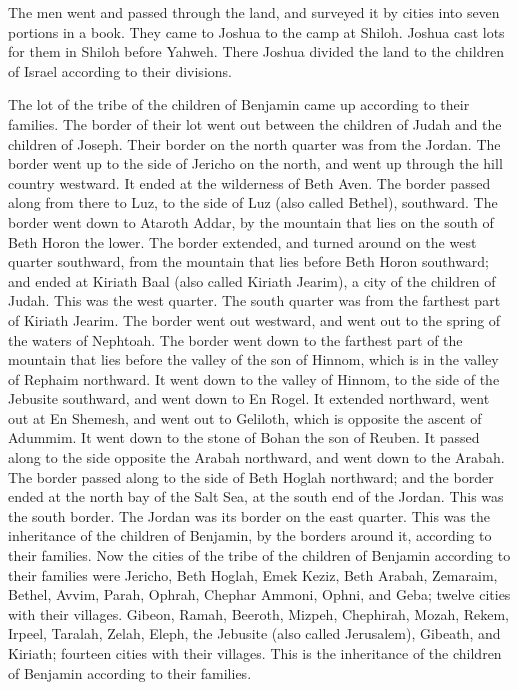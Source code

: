  The men went and passed through the land, and surveyed it
by cities into seven portions in a book. They came to Joshua to the camp
at Shiloh.  Joshua cast lots for them in Shiloh before
Yahweh. There Joshua divided the land to the children of Israel
according to their divisions.

 The lot of the tribe of the children of Benjamin came up
according to their families. The border of their lot went out between
the children of Judah and the children of Joseph.  Their
border on the north quarter was from the Jordan. The border went up to
the side of Jericho on the north, and went up through the hill country
westward. It ended at the wilderness of Beth Aven.  The
border passed along from there to Luz, to the side of Luz (also called
Bethel), southward. The border went down to Ataroth Addar, by the
mountain that lies on the south of Beth Horon the lower. 
The border extended, and turned around on the west quarter southward,
from the mountain that lies before Beth Horon southward; and ended at
Kiriath Baal (also called Kiriath Jearim), a city of the children of
Judah. This was the west quarter.  The south quarter was
from the farthest part of Kiriath Jearim. The border went out westward,
and went out to the spring of the waters of Nephtoah. 
The border went down to the farthest part of the mountain that lies
before the valley of the son of Hinnom, which is in the valley of
Rephaim northward. It went down to the valley of Hinnom, to the side of
the Jebusite southward, and went down to En Rogel.  It
extended northward, went out at En Shemesh, and went out to Geliloth,
which is opposite the ascent of Adummim. It went down to the stone of
Bohan the son of Reuben.  It passed along to the side
opposite the Arabah northward, and went down to the Arabah.
 The border passed along to the side of Beth Hoglah
northward; and the border ended at the north bay of the Salt Sea, at the
south end of the Jordan. This was the south border.  The
Jordan was its border on the east quarter. This was the inheritance of
the children of Benjamin, by the borders around it, according to their
families.  Now the cities of the tribe of the children of
Benjamin according to their families were Jericho, Beth Hoglah, Emek
Keziz,  Beth Arabah, Zemaraim, Bethel, 
Avvim, Parah, Ophrah,  Chephar Ammoni, Ophni, and Geba;
twelve cities with their villages.  Gibeon, Ramah,
Beeroth,  Mizpeh, Chephirah, Mozah, 
Rekem, Irpeel, Taralah,  Zelah, Eleph, the Jebusite (also
called Jerusalem), Gibeath, and Kiriath; fourteen cities with their
villages. This is the inheritance of the children of Benjamin according
to their families.

